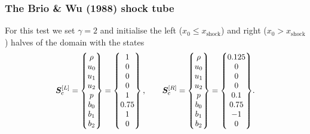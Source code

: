 \subsubsection{The Brio \& Wu (1988) shock tube}
\label{sec:scheme-comparison:shocks:brio-wu}

For this test we set $\gamma=2$ and initialise the left ($x_0 \leq x_\mathrm{shock}$) and right ($x_0 > x_\mathrm{shock}$) halves of the domain with the states
\begin{align}
\scalebox{0.95}{$\displaystyle
    \mVector{S}_\mathrm{c}^{[L]}
        = \begin{Bmatrix}
                \rho \\
                u_0 \\
                u_1 \\
                u_2 \\
                p \\
                b_0 \\
                b_1 \\
                b_2
            \end{Bmatrix}
        = \begin{Bmatrix}
                1 \\
                0 \\
                0 \\
                0 \\
                1 \\
                0.75 \\
                1 \\
                0
            \end{Bmatrix}
    , \qquad
    \mVector{S}_\mathrm{c}^{[R]}
        = \begin{Bmatrix}
                \rho \\
                u_0 \\
                u_1 \\
                u_2 \\
                p \\
                b_0 \\
                b_1 \\
                b_2
            \end{Bmatrix}
        = \begin{Bmatrix}
                0.125 \\
                0 \\
                0 \\
                0 \\
                0.1 \\
                0.75 \\
                -1 \\
                0
            \end{Bmatrix}
$}
    .
\end{align}

